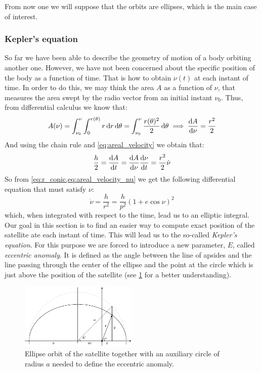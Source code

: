 \documentclass[../main.tex]{subfiles}
\begin{document}
From now one we will suppose that the orbits are ellipses, which is the main case of interest.
\subsubsection{Kepler's equation}
So far we have been able to describe the geometry of motion of a body orbiting another one. However, we have not been concerned about the specific position of the body as a function of time. That is how to obtain $\nu(t)$ at each instant of time. In order to do this, we may think the area $A$ as a function of $\nu$, that measures the area swept by the radio vector from an initial instant $\nu_0$. Thus, from differential calculus we know that:
\begin{equation}
  A(\nu)=\int_{\nu_0}^{\nu}\int_{0}^{r(\theta)}r\dd{r}\dd{\theta}=\int_{\nu_0}^{\nu}\frac{r(\theta)^2}{2}\dd{\theta}\implies\dv{A}{\nu}=\frac{r^2}{2}
\end{equation}
And using the chain rule and \cref{eq:areal_velocity} we obtain that:
\begin{equation}\label{eq:areal_velocity_nu}
  \frac{h}{2}=\dv{A}{t}=\dv{A}{\nu}\dv{\nu}{t}=\frac{r^2}{2}\dot\nu
\end{equation}
So from \cref{eq:r_conic,eq:areal_velocity_nu} we get the following differential equation that must satisfy $\nu$:
\begin{equation}
  \dot\nu=\frac{h}{r^2}=\frac{h}{p^2}{(1+e\cos\nu)}^2
\end{equation}
which, when integrated with respect to the time, lead us to an elliptic integral. Our goal in this section is to find an easier way to compute exact position of the satellite ate each instant of time. This will lead us to the so-called \emph{Kepler's equation}. For this purpose we are forced to introduce a new parameter, $E$, called \emph{eccentric anomaly}. It is defined as the angle between the line of apsides and the line passing through the center of the ellipse and the point at the circle which is just above the position of the satellite (see \cref{fig:kepler_eq} for a better understanding).
\begin{figure}[ht]
  \centering
  \includegraphics[width=0.5\textwidth]{Images/kepler_eq.pdf}
  \caption{Ellipse orbit of the satellite together with an auxiliary circle of radius $a$ needed to define the eccentric anomaly.}
  \label{fig:kepler_eq}
\end{figure}
\end{document}
